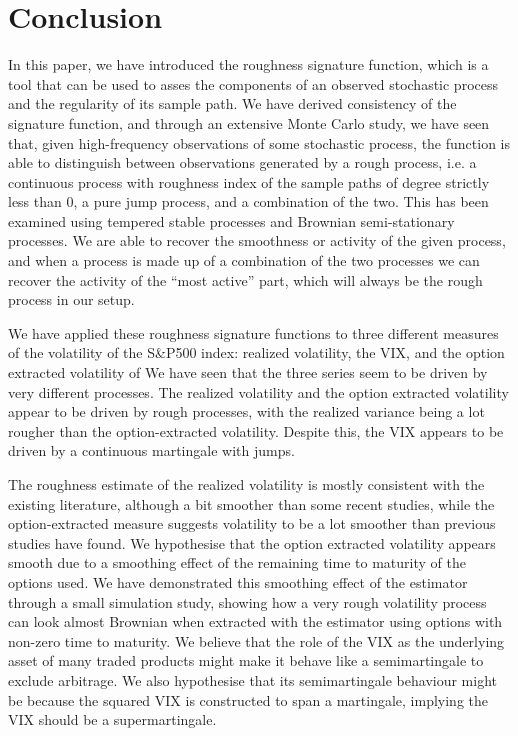 \documentclass[fleqn,11pt,letterpaper]{article}
\theoremstyle{plain}
\theoremstyle{definition}
\theoremstyle{remark}
\numberwithin{equation}{section}
\begin{document}
\section{Conclusion}\label{sec:conclusion}
In this paper, we have introduced the roughness signature function, which is a tool that can be used to asses the components of an observed stochastic process and the regularity of its sample path. We have derived consistency of the signature function, and through an extensive Monte Carlo study, we have seen that, given high-frequency observations of some stochastic process, the function is able to distinguish between observations generated by a rough process, i.e. a continuous process with roughness index of the sample paths of degree strictly less than $0$, a pure jump process, and a combination of the two. This has been examined using tempered stable processes and Brownian semi-stationary processes. We are able to recover the smoothness or activity of the given process, and when a process is made up of a combination of the two processes we can recover the activity of the ``most active'' part, which will always be the rough process in our setup.

We have applied these roughness signature functions to three different measures of the volatility of the S\&P500 index: realized volatility, the VIX, and the option extracted volatility of \cite{Todorov2019} We have seen that the three series seem to be driven by very different processes. The realized volatility and the option extracted volatility appear to be driven by rough processes, with the realized variance being a lot rougher than the option-extracted volatility. Despite this, the VIX appears to be driven by a continuous martingale with jumps. 

The roughness estimate of the realized volatility is mostly consistent with the existing literature, although a bit smoother than some recent studies, while the option-extracted measure suggests volatility to be a lot smoother than previous studies have found. We hypothesise that the option extracted volatility appears smooth due to a smoothing effect of the remaining time to maturity of the options used. We have demonstrated this smoothing effect of the estimator through a small simulation study, showing how a very rough volatility process can look almost Brownian when extracted with the \cite{Todorov2019} estimator using options with non-zero time to maturity. We believe that the role of the VIX as the underlying asset of many traded products might make it behave like a semimartingale to exclude arbitrage. We also hypothesise that its semimartingale behaviour might be because the squared VIX is constructed to span a martingale, implying the VIX should be a supermartingale. 
\end{document}
